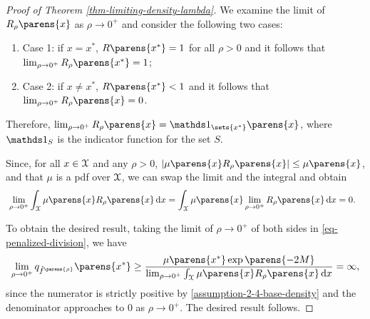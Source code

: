 \begin{proof}[Proof of Theorem \ref{thm-limiting-density-lambda}]
	We examine the limit of $R_{\rho} \parens{x}$ as $\rho \to 0^+$ and consider the following two cases: 
	\begin{enumerate}
		\item[] Case 1: if $x = x^*$, $R \parens{x^*} = 1$ for all $\rho > 0$ and it follows that $\lim_{\rho \to 0^+} R_{\rho} \parens{x^*} = 1$; 
		\item[] Case 2: if $x \neq x^*$, $R \parens{x^*} < 1$ and it follows that $\lim_{\rho \to 0^+} R_{\rho} \parens{x} = 0$. 
	\end{enumerate}
	Therefore, $\lim_{\rho \to 0^+} R_{\rho} \parens{x} = \indic_{\sets{x^*}} \parens{x}$, where $\indic_S$ is the indicator function for the set $S$. 
	
	Since, for all $x \in \mathcal{X}$ and any $\rho > 0$, $\abs{\mu \parens{x} R_{\rho} \parens{x}} \le \mu \parens{x}$, and that $\mu$ is a pdf over $\mathcal{X}$, we can swap the limit and the integral and obtain 
	\begin{align*}
	    & \, \lim_{\rho \to 0^+} \int_{\calX} \mu \parens{x} R_{\rho} \parens{x} \, \diff x = \int_{\calX} \mu \parens{x} \lim_{\rho \to 0^+} R_{\rho} \parens{x} \, \diff x = 0. 
	\end{align*}
	
	To obtain the desired result, taking the limit of $\rho \to 0^+$ of both sides in \eqref{eq-penalized-division}, we have 
	\begin{align*}
		\lim_{\rho \to 0^+} q_{\hat{f}^{\parens{\rho}}} \parens{x^*} \ge \frac{\mu \parens{x^*} \exp \parens{-2M}}{\lim_{\rho \to 0^+} \int_{\calX} \mu \parens{x} R_{\rho} \parens{x} \, \diff x}  = \infty, 
	\end{align*}
	since the numerator is strictly positive by \ref{assumption-2-4-base-density} and the denominator approaches to 0 as $\rho \to 0^+$. The desired result follows. 
\end{proof}

